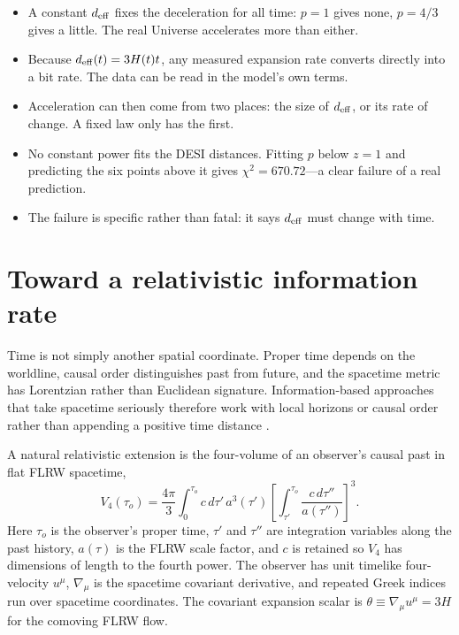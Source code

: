 \documentclass[10pt]{article}
\newenvironment{persuasions}
  {\begin{cpbox}\small\setlength{\parskip}{0pt}%
   {\footnotesize\bfseries\color{accent}%
    \textls[110]{CONCEPTUAL PERSUASIONS}}\par\vspace{3pt}%
   \begin{itemize}[leftmargin=1.15em,itemsep=2.5pt,topsep=0pt,parsep=0pt,
                   label=\textcolor{accent}{\scriptsize$\blacktriangleright$}]}
  {\end{itemize}\end{cpbox}}
\begin{document}
\begin{persuasions}
\item A constant $d_{\rm eff}$ fixes the deceleration for all time: $p=1$ gives
none, $p=4/3$ gives a little.  The real Universe accelerates more than either.
\item Because $d_{\rm eff}(t)=3H(t)t$, any measured expansion rate converts
directly into a bit rate.  The data can be read in the model's own terms.
\item Acceleration can then come from two places: the size of $d_{\rm eff}$, or
its rate of change.  A fixed law only has the first.
\item No constant power fits the DESI distances.  Fitting $p$ below $z=1$ and
predicting the six points above it gives $\chi^2=670.72$---a clear failure of a
real prediction.
\item The failure is specific rather than fatal: it says $d_{\rm eff}$ must
change with time.
\end{persuasions}

\section*{Toward a relativistic information rate}

Time is not simply another spatial coordinate.  Proper time depends on the
worldline, causal order distinguishes past from future, and the spacetime
metric has Lorentzian rather than Euclidean signature.  Information-based
approaches that take spacetime seriously therefore work with local horizons or
causal order rather than appending a positive time distance
\citep{Jacobson1995,Surya2019}.

A natural relativistic extension is the four-volume of an observer's causal
past in flat FLRW spacetime,
\begin{equation}
V_4(\tau_o)=\frac{4\pi}{3}\int_0^{\tau_o}c\,d\tau'\,a^3(\tau')
\left[\int_{\tau'}^{\tau_o}\frac{c\,d\tau''}{a(\tau'')}\right]^3.
\label{eq:causal-volume}
\end{equation}
Here $\tau_o$ is the observer's proper time, $\tau'$ and $\tau''$ are integration
variables along the past history, $a(\tau)$ is the FLRW scale factor, and $c$
is retained so $V_4$ has dimensions of length to the fourth power.  The
observer has unit timelike four-velocity $u^\mu$, $\nabla_\mu$ is the spacetime
covariant derivative, and repeated Greek indices run over spacetime
coordinates.  The covariant expansion scalar is
$\theta\equiv\nabla_\mu u^\mu=3H$ for the comoving FLRW flow.
\end{document}
